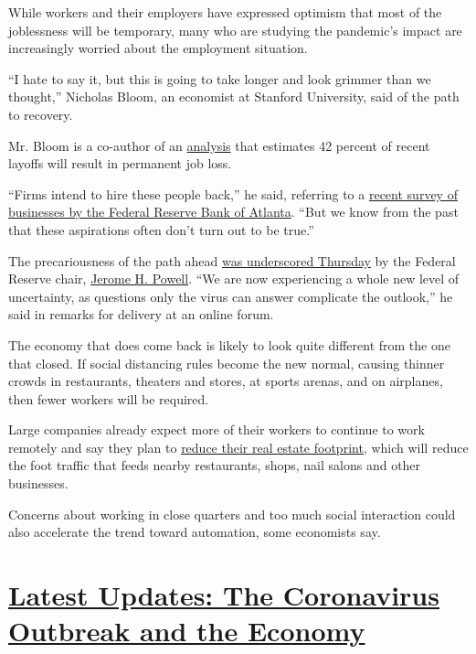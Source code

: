 While workers and their employers have expressed optimism that most of
the joblessness will be temporary, many who are studying the pandemic's
impact are increasingly worried about the employment situation.

``I hate to say it, but this is going to take longer and look grimmer
than we thought,'' Nicholas Bloom, an economist at Stanford University,
said of the path to recovery.

Mr. Bloom is a co-author of an
\href{https://bfi.uchicago.edu/wp-content/uploads/BFI_WP_202059.pdf}{analysis}
that estimates 42 percent of recent layoffs will result in permanent job
loss.

``Firms intend to hire these people back,'' he said, referring to a
\href{https://www.frbatlanta.org/research/surveys/business-uncertainty}{recent
survey of businesses by the Federal Reserve Bank of Atlanta}. ``But we
know from the past that these aspirations often don't turn out to be
true.''

The precariousness of the path ahead
\href{https://www.nytimes.com/2020/05/21/business/economy/fed-chair-warns-this-is-a-downturn-without-modern-precedent.html}{was
underscored Thursday} by the Federal Reserve chair,
\href{https://www.nytimes.com/2020/05/19/business/coronavirus-stocks-economy.html}{Jerome
H. Powell}. ``We are now experiencing a whole new level of uncertainty,
as questions only the virus can answer complicate the outlook,'' he said
in remarks for delivery at an online forum.

The economy that does come back is likely to look quite different from
the one that closed. If social distancing rules become the new normal,
causing thinner crowds in restaurants, theaters and stores, at sports
arenas, and on airplanes, then fewer workers will be required.

Large companies already expect more of their workers to continue to work
remotely and say they plan to
\href{https://www.prnewswire.com/news-releases/deloitte-cfo-signals-survey-executive-teams-are-largely-focused-on-adapting-operations-for-near-term-performance-and-evolving-their-businesses-for-a-post-crisis-future-301061671.html}{reduce
their real estate footprint,} which will reduce the foot traffic that
feeds nearby restaurants, shops, nail salons and other businesses.

Concerns about working in close quarters and too much social interaction
could also accelerate the trend toward automation, some economists say.

\hypertarget{latest-updates-the-coronavirus-outbreak-and-the-economy}{%
\section{\texorpdfstring{\href{https://www.nytimes.com/live/2020/08/07/business/stock-market-today-coronavirus?action=click\&pgtype=Article\&state=default\&region=MAIN_CONTENT_1\&context=storylines_live_updates}{Latest
Updates: The Coronavirus Outbreak and the
Economy}}{Latest Updates: The Coronavirus Outbreak and the Economy}}\label{latest-updates-the-coronavirus-outbreak-and-the-economy}}

